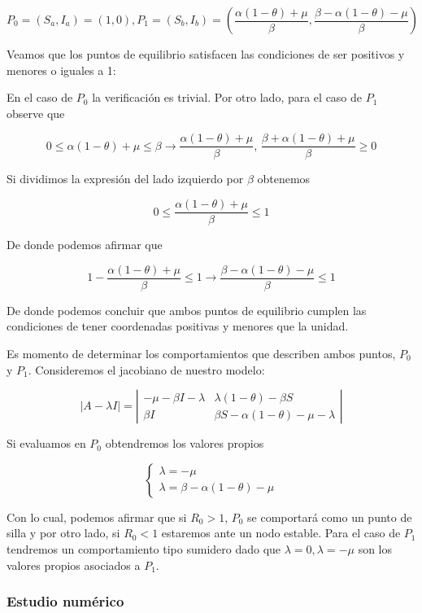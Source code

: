 $$P_0=(S_a,I_a)=(1,0), P_1=(S_b,I_b)=\left(\frac{\alpha(1-\theta)+\mu}{\beta},\frac{\beta-\alpha(1-\theta)-\mu}{\beta}\right)$$

Veamos que los puntos de equilibrio satisfacen las condiciones de ser positivos y menores o iguales a 1:

En el caso de $P_0$ la verificación es trivial. Por otro lado, para el caso de $P_1$ observe que 

$$0\leq\alpha(1-\theta)+\mu\leq\beta \longrightarrow \frac{\alpha(1-\theta)+\mu}{\beta}\text{, }\frac{\beta+\alpha(1-\theta)+\mu}{\beta}\geq0$$

Si dividimos la expresión del lado izquierdo por $\beta$ obtenemos

$$0\leq \frac{\alpha(1-\theta)+\mu}{\beta}\leq1$$

De donde podemos afirmar que 

$$1-\frac{\alpha(1-\theta)+\mu}{\beta}\leq1 \longrightarrow \frac{\beta-\alpha(1-\theta)-\mu}{\beta}\leq1$$

De donde podemos concluir que ambos puntos de equilibrio cumplen las condiciones de tener coordenadas positivas y menores que la unidad.

Es momento de determinar los comportamientos que describen ambos puntos, $P_0$ y $P_1$. Consideremos el jacobiano de nuestro modelo:

$$|A-\lambda I|=
\left|\begin{array}{cc}
-\mu-\beta I-\lambda & \lambda(1-\theta)-\beta S \\
\beta I & \beta S-\alpha(1-\theta)-\mu-\lambda
\end{array}\right|$$

Si evaluamos en $P_0$ obtendremos los valores propios

$$\left\{\begin{array}{l}\lambda=-\mu \\
\lambda=\beta-\alpha(1-\theta)-\mu\end{array}\right.$$

Con lo cual, podemos afirmar que si $R_0>1$, $P_0$ se comportará como un punto de silla y por otro lado, si $R_0<1$ estaremos ante un nodo estable. Para el caso de $P_1$ tendremos un comportamiento tipo sumidero dado que $\lambda=0,\lambda=-\mu$ son los valores propios asociados a $P_1$.

\subsubsection{Estudio numérico}

